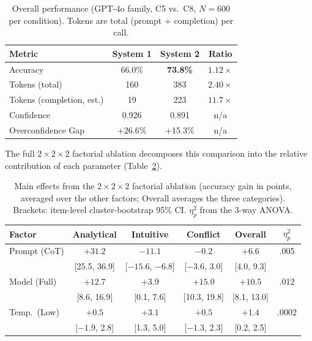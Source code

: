 \documentclass[conference]{IEEEtran}
\newcommand{\ci}[1]{{\scriptsize[#1]}}
\begin{document}
\begin{table}[t]
\caption{Overall performance (GPT-4o family, C5 vs.\ C8, $N = 600$ per condition). Tokens are total (prompt + completion) per call.}
\label{tab:main-results}
\centering
\begin{tabular}{lccc}
\toprule
Metric & System 1 & System 2 & Ratio \\
\midrule
Accuracy & 66.0\% & \textbf{73.8\%} & $1.12\times$ \\
Tokens (total) & 160 & 383 & $2.40\times$ \\
Tokens (completion, est.) & 19 & 223 & $11.7\times$ \\
Confidence & 0.926 & 0.891 & n/a \\
Overconfidence Gap & +26.6\% & +15.3\% & n/a \\
\bottomrule
\end{tabular}
\end{table}

The full $2 \times 2 \times 2$ factorial ablation decomposes this comparison into the relative contribution of each parameter (Table~\ref{tab:main-effects}).

\begin{table}[t]
\caption{Main effects from the $2 \times 2 \times 2$ factorial ablation (accuracy gain in points, averaged over the other factors; Overall averages the three categories). Brackets: item-level cluster-bootstrap 95\% CI. $\eta^2_p$ from the 3-way ANOVA.}
\label{tab:main-effects}
\centering
\setlength{\tabcolsep}{3.3pt}
\begin{tabular}{lccccc}
\toprule
Factor & Analytical & Intuitive & Conflict & Overall & $\eta^2_p$ \\
\midrule
Prompt (CoT) & $+31.2$ & $-11.1$ & $-0.2$ & $+6.6$ & .005 \\
 & \ci{25.5, 36.9} & \ci{$-15.6$, $-6.8$} & \ci{$-3.6$, 3.0} & \ci{4.0, 9.3} & \\
Model (Full) & $+12.7$ & $+3.9$ & $+15.0$ & $+10.5$ & .012 \\
 & \ci{8.6, 16.9} & \ci{0.1, 7.6} & \ci{10.3, 19.8} & \ci{8.1, 13.0} & \\
Temp.\ (Low) & $+0.5$ & $+3.1$ & $+0.5$ & $+1.4$ & .0002 \\
 & \ci{$-1.9$, 2.8} & \ci{1.3, 5.0} & \ci{$-1.3$, 2.3} & \ci{0.2, 2.5} & \\
\bottomrule
\end{tabular}
\end{table}
\end{document}
